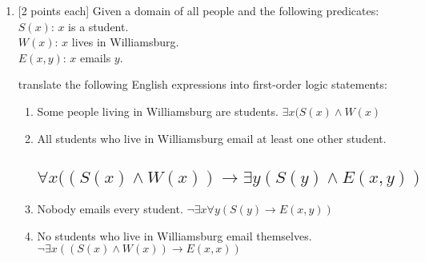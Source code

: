 \documentclass[11pt]{article}
\begin{document}
\begin{enumerate}
\vskip 0.5cm


\item {[2 points each]}  Given a domain of all people and the following predicates:
\\ \hspace*{3cm} {$S(x)$}: $x$ is a student.
\\ \hspace*{3cm} {$W(x)$}: $x$ lives in Williamsburg.
\\ \hspace*{3cm} {$E(x,y)$}: $x$ emails $y$.

translate the following English expressions into first-order logic statements:

\begin{enumerate}[label=\alph*.]
\itemsep-0mm
\item Some people living in Williamsburg are students. 
$\exists x (S(x) \wedge W(x)$
\item 
All students who live in Williamsburg email at least one other student.\subsection{$\forall x  ((S(x) \wedge W(x))  \rightarrow \exists y(S(y)\wedge E(x,y))$} 
\item Nobody emails every student. $\neg \exists x \forall y (S(y) \rightarrow E(x,y))$
\item No students who live in Williamsburg email themselves. $\neg \exists x ((S(x) \wedge W(x)) \rightarrow E(x,x))$
\end{enumerate}
\end{enumerate}
\end{document}
